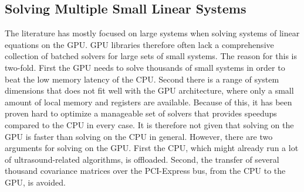 \documentclass[journal]{IEEEtran}
\begin{document}

\subsection{Solving Multiple Small Linear Systems}
The literature has mostly focused on large systems when solving systems of linear equations on the GPU. GPU libraries therefore often lack a comprehensive collection of batched solvers for large sets of small systems. The reason for this is two-fold. First the GPU needs to solve thousands of small systems in order to beat the low memory latency of the CPU. Second there is a range of system dimensions that does not fit well with the GPU architecture, where only a small amount of local memory and registers are available. Because of this, it has been proven hard to optimize a manageable set of solvers that provides speedups compared to the CPU in every case. It is therefore not given that solving on the GPU is faster than solving on the CPU in general. However, there are two arguments for solving on the GPU. First the CPU, which might already run a lot of ultrasound-related algorithms, is offloaded. Second, the transfer of several thousand covariance matrices over the PCI-Express bus, from the CPU to the GPU, is avoided.
\end{document}
